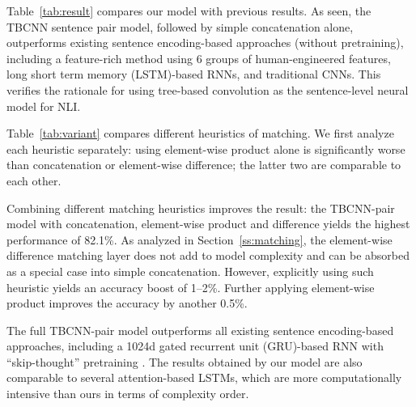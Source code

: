 \documentclass[11pt]{article}
\begin{document}
\begin{table}[!t]
\centering
{}
\caption{Validation and test accuracies of TBCNN-pair variants (in percentage).}\label{tab:variant}
\end{table}
Table~\ref{tab:result} compares our model with previous results. As seen, the TBCNN sentence pair model, followed by simple concatenation alone, outperforms existing sentence encoding-based approaches (without pretraining), including a feature-rich method using 6 groups of human-engineered features, long short term memory (LSTM)-based RNNs, and traditional CNNs. This verifies the rationale for using tree-based convolution as the sentence-level neural model for NLI.


Table~\ref{tab:variant} compares different heuristics of matching. We first analyze each heuristic separately: using element-wise product alone is significantly worse than concatenation or element-wise difference; the latter two are comparable to each other. 

Combining different matching heuristics improves the result: the TBCNN-pair model with concatenation, element-wise product and difference yields the highest performance of 82.1\%. As analyzed in Section~\ref{ss:matching}, the element-wise difference matching layer does not add to model complexity and can be absorbed as a special case into simple concatenation. However, explicitly using such heuristic yields an accuracy boost of 1--2\%. Further applying element-wise product improves the accuracy by another 0.5\%. 



The full TBCNN-pair model outperforms all existing sentence encoding-based approaches, including a 1024d gated recurrent unit (GRU)-based RNN with ``skip-thought'' pretraining \cite{skipthought}. The results obtained by our model are also comparable to several attention-based LSTMs, which are more computationally intensive than ours in terms of complexity order. 
\end{document}
